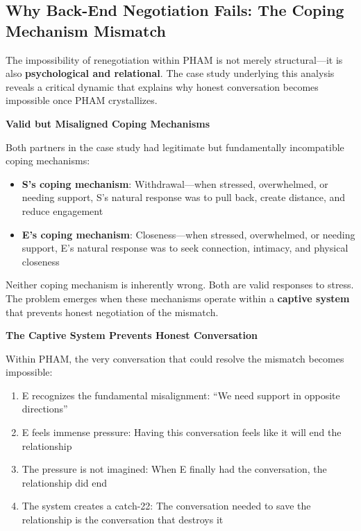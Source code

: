 \documentclass[12pt,openany]{book}
\numberwithin{equation}{chapter}
\begin{document}
\subsection{Why Back-End Negotiation Fails: The Coping Mechanism Mismatch}

The impossibility of renegotiation within PHAM is not merely structural---it is also \textbf{psychological and relational}. The case study underlying this analysis reveals a critical dynamic that explains why honest conversation becomes impossible once PHAM crystallizes.

\textbf{Valid but Misaligned Coping Mechanisms}

Both partners in the case study had legitimate but fundamentally incompatible coping mechanisms:

\begin{itemize}
    \item \textbf{S's coping mechanism}: Withdrawal---when stressed, overwhelmed, or needing support, S's natural response was to pull back, create distance, and reduce engagement
    \item \textbf{E's coping mechanism}: Closeness---when stressed, overwhelmed, or needing support, E's natural response was to seek connection, intimacy, and physical closeness
\end{itemize}

Neither coping mechanism is inherently wrong. Both are valid responses to stress. The problem emerges when these mechanisms operate within a \textbf{captive system} that prevents honest negotiation of the mismatch.

\textbf{The Captive System Prevents Honest Conversation}

Within PHAM, the very conversation that could resolve the mismatch becomes impossible:

\begin{enumerate}
    \item E recognizes the fundamental misalignment: ``We need support in opposite directions''
    \item E feels immense pressure: Having this conversation feels like it will end the relationship
    \item The pressure is not imagined: When E finally had the conversation, the relationship did end
    \item The system creates a catch-22: The conversation needed to save the relationship is the conversation that destroys it
\end{enumerate}
\end{document}
